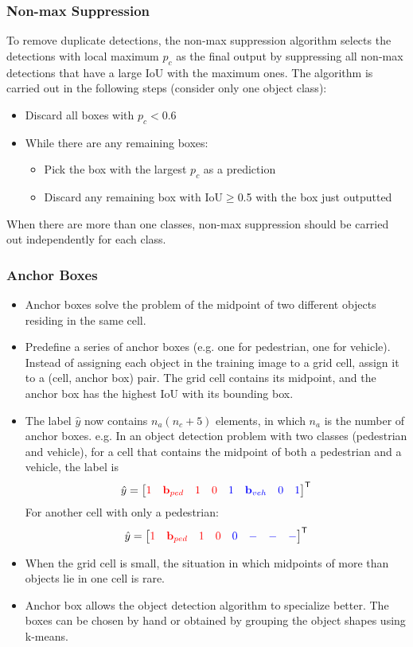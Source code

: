 \subsubsection{Non-max Suppression}
To remove duplicate detections, the non-max suppression algorithm selects the detections with local maximum $p_c$ as the final output by suppressing all non-max detections that have a large IoU with the maximum ones. The algorithm is carried out in the following steps (consider only one object class):
\begin{itemize}
\item Discard all boxes with $p_c<0.6$
\item While there are any remaining boxes:
\begin{itemize}
    \item Pick the box with the largest $p_c$ as a prediction
    \item Discard any remaining box with IoU$\ge$0.5 with the box just outputted
\end{itemize}
\end{itemize}
When there are more than one classes, non-max suppression should be carried out independently for each class.
\subsubsection{Anchor Boxes}
\begin{itemize}
  \item Anchor boxes solve the problem of the midpoint of two different objects residing in the same cell.
  \item Predefine a series of anchor boxes (e.g. one for pedestrian, one for vehicle). Instead of assigning each object in the training image to a grid cell, assign it to a (cell, anchor box) pair. The grid cell contains its midpoint, and the anchor box has the highest IoU with its bounding box. 
  \item The label $\hat{y}$ now contains $n_a\left(n_c+5\right)$ elements, in which $n_a$ is the number of anchor boxes. e.g. In an object detection problem with two classes (pedestrian and vehicle), for a cell that contains the midpoint of both a pedestrian and a vehicle, the label is 
  \[\hat{y}=\begin{bmatrix}
    \color{red}1 & \color{red}\mathbf{b}_{ped} & \color{red}1 & \color{red}0 & \color{blue}1 & \color{blue}\mathbf{b}_{veh} & \color{blue}0 & \color{blue}1  
  \end{bmatrix}^{\mathsf{T}}\]
  For another cell with only a pedestrian: 
  \[\hat{y}=\begin{bmatrix}
    \color{red}1 & \color{red}\mathbf{b}_{ped} & \color{red}1 & \color{red}0 & \color{blue}0 & \color{blue}- & \color{blue}- & \color{blue}-
  \end{bmatrix}^{\mathsf{T}}\]
  \item When the grid cell is small, the situation in which midpoints of more than objects lie in one cell is rare.
  \item Anchor box allows the object detection algorithm to specialize better. The boxes can be chosen by hand or obtained by grouping the object shapes using k-means.
\end{itemize}
